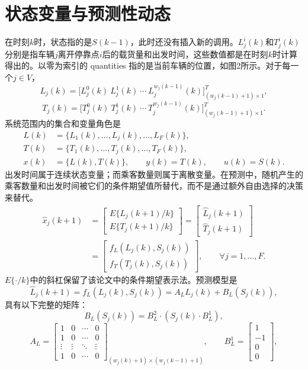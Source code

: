 \documentclass[11pt]{article}
\begin{document}
\section*{状态变量与预测性动态}
在时刻$k$时，状态指的是$S(k-1)$，此时还没有插入新的调用。$L_j^i(k)$和$T_j^i(k)$分别是指车辆$j$离开停靠点$i$后的载货量和出发时间，这些数值都是在时刻$k$时计算得出的。以零为索引的 quantities 指的是当前车辆的位置，如图2所示。对于每一个$j\in V$，
\begin{equation}
L_j(k)=
\bigl[L_j^0(k)\ L_j^1(k)\ \cdots\ L_j^{w_j(k-1)}(k)\bigr]^T_{(w_j(k-1)+1)\times1},
\tag{4}
\end{equation}
\begin{equation}
T_j(k)=
\bigl[T_j^0(k)\ T_j^1(k)\ \cdots\ T_j^{w_j(k-1)}(k)\bigr]^T_{(w_j(k-1)+1)\times1}.
\tag{5}
\end{equation}
系统范围内的集合和变量角色是
\[
\begin{aligned}
L(k)&=\{L_1(k),\ldots,L_j(k),\ldots,L_F(k)\},\\
T(k)&=\{T_1(k),\ldots,T_j(k),\ldots,T_F(k)\},\\
x(k)&=\{L(k),T(k)\},\qquad y(k)=T(k),\qquad u(k)=S(k).
\end{aligned}
\]
出发时间属于连续状态变量；而乘客数量则属于离散变量。在预测中，随机产生的乘客数量和出发时间被它们的条件期望值所替代，而不是通过额外自由选择的决策来替代。
\begin{equation}
\begin{aligned}
\hat{x}_j(k+1)
&=\begin{bmatrix}
E\{L_j(k+1)/k\}\\ E\{T_j(k+1)/k\}
\end{bmatrix}
=\begin{bmatrix}\hat{L}_j(k+1)\\\widehat{T}_j(k+1)\end{bmatrix}\\
&=\begin{bmatrix}
f_L(L_j(k),S_j(k))\\
f_T(T_j(k),S_j(k))
\end{bmatrix},\qquad \forall j=1,\ldots,F.
\end{aligned}
\tag{6}
\end{equation}
$E\{\cdot/k\}$中的斜杠保留了该论文中的条件期望表示法。预测模型是
\begin{equation}
\hat{L}_j(k+1)=f_L(L_j(k),S_j(k))
=A_LL_j(k)+B_L(S_j(k)),
\tag{8}
\end{equation}
具有以下完整的矩阵：
\[
B_L(S_j(k))=B_L^2\cdot(S_j(k)\cdot B_L^1),
\]
\[
A_L=
\begin{bmatrix}
1&0&\cdots&0\\
1&0&\cdots&0\\
\vdots&\vdots&\ddots&\vdots\\
1&0&\cdots&0
\end{bmatrix}_{(w_j(k)+1)\times(w_j(k-1)+1)},
\qquad
B_L^1=\begin{bmatrix}1\\-1\\0\\0\end{bmatrix},
\]
\end{document}
